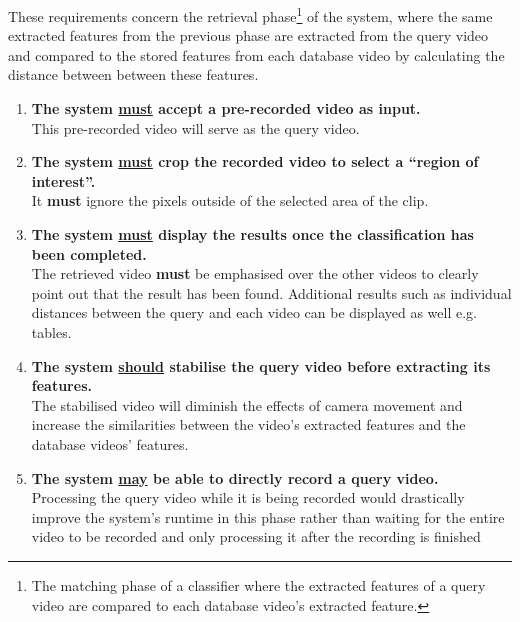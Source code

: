 These requirements concern the retrieval phase\footnote{The matching phase of a classifier where the extracted features of a query video are compared to each database video's extracted feature.} of the system, where the same extracted features from the previous phase are extracted from the query video and compared to the stored features from each database video by calculating the distance between between these features.

\begin{enumerate}
    \item \textbf{The system \underline{must} accept a pre-recorded video as input.}\\
    This pre-recorded video will serve as the query video.
    
    \item \textbf{The system \underline{must} crop the recorded video to select a ``region of interest''.}\\
    It \textbf{must} ignore the pixels outside of the selected area of the clip.
    
    \item \textbf{The system \underline{must} display the results once the classification has been completed.}\\
    The retrieved video \textbf{must} be emphasised over the other videos to clearly point out that the result has been found. Additional results such as individual distances between the query and each video can be displayed as well e.g. tables.
    
    \item \textbf{The system \underline{should} stabilise the query video before extracting its features.}\\
    The stabilised video will diminish the effects of camera movement and increase the similarities between the video's extracted features and the database videos' features.
    
    \item \textbf{The system \underline{may} be able to directly record a query video.}\\
    Processing the query video while it is being recorded would drastically improve the system's runtime in this phase rather than waiting for the entire video to be recorded and only processing it after the recording is finished
    
    
\end{enumerate}

